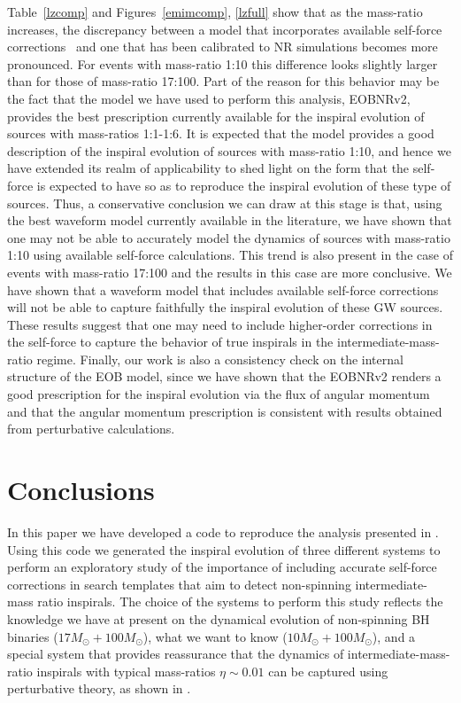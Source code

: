Table~\ref{lzcomp} and Figures~\ref{emimcomp}, \ref{lzfull} show that as the mass-ratio increases, the discrepancy between a model that incorporates available self-force corrections~\cite{sago} and one that has been calibrated to NR simulations becomes more pronounced. For events with mass-ratio 1:10 this difference looks slightly larger than for those of mass-ratio 17:100. Part of the reason for this behavior may be the fact that the model we have used to perform this analysis, EOBNRv2, provides the best prescription currently available for the inspiral evolution of sources with mass-ratios 1:1-1:6. It is expected that the model provides a good description of the inspiral evolution of sources with mass-ratio 1:10, and hence we have extended its realm of applicability to shed light on the form that the self-force is expected to have so as to reproduce the inspiral evolution of these type of sources. Thus, a conservative conclusion we can draw at this stage is that, using the best waveform model currently 
available in the literature, we have shown that  one may not be able to accurately model the dynamics of sources with mass-ratio 1:10 using available self-force calculations.  This trend is also present   in the case of events with mass-ratio 17:100 and the results in this case are more conclusive. We have shown that a waveform model that includes available self-force corrections will not be able to capture faithfully the inspiral evolution of these GW sources. These results suggest that one may need to include higher-order corrections in the self-force to capture the behavior of true inspirals in the intermediate-mass-ratio regime. Finally, our work is also a consistency check on the internal structure of the EOB model, since we have shown that the EOBNRv2 renders a good prescription for the inspiral evolution via the flux of angular momentum and that the angular momentum prescription is consistent with results obtained from perturbative calculations. 
\clearpage

 
 \section{Conclusions}
 \label{s4}
 
 In this paper we have developed a code to reproduce the analysis presented in \cite{BuonannoEOBv2Main}. Using this code we generated the inspiral evolution of three different systems to perform an exploratory study of the importance of including accurate self-force corrections in search templates that aim to detect non-spinning intermediate-mass ratio inspirals. The choice of the systems to perform this study reflects the knowledge we have at present on the dynamical evolution of non-spinning BH binaries (\(17M_{\odot} + 100M_{\odot}\)), what we want to know (\(10 M_{\odot} + 100M_{\odot}\)), and a special system that  provides reassurance that the dynamics of intermediate-mass-ratio inspirals with typical mass-ratios \(\eta\sim 0.01\) can be captured using perturbative theory, as shown in \cite{carlos,ulr}. 
 
